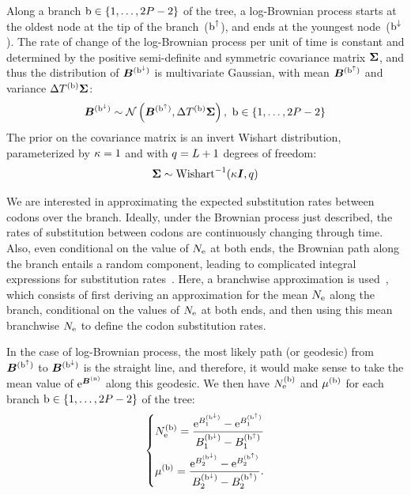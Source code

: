 \documentclass{MBE}
\begin{document}
	Along a branch $\text{b} \in \{1, \hdots, 2 P - 2\}$ of the tree, a log-Brownian process starts at the oldest node at the tip of the branch~($\text{b}^{\uparrow}$), and ends at the youngest node~($\text{b}^{\downarrow}$).
	The rate of change of the log-Brownian process per unit of time is constant and determined by the positive semi-definite and symmetric covariance matrix $\bm{\Sigma}$, and thus the distribution of $\bm{B}^{(\text{b}^{\downarrow})}$ is multivariate Gaussian, with mean $\bm{B}^{(\text{b}^{\uparrow})}$ and variance $\Delta T^{(\text{b})} \bm{\Sigma}$:
	\begin{equation}
		\label{eq:DistribBrownian}
		\Brownian^{(\nodeDown)} \sim \mathcal{N}\left(\Brownian^{(\nodeUp)}, \branchtime\branchexp \CovarianceMatrix \right),\ \Setbranch
	\end{equation}
	The {prior} on the covariance matrix is an invert Wishart distribution, parameterized by $\kappa=1$ and with $q=L + 1$ degrees of freedom:
	\begin{equation}
		\label{eq:Distribcovariance}
		\CovarianceMatrix \sim \text{Wishart}^{-1} (\covariancekappa \Identitymatrix, \covariancedf)
	\end{equation}

	We are interested in approximating the expected substitution rates between codons over the branch.
	Ideally, under the Brownian process just described, the rates of substitution between codons are continuously changing through time.
	Also, even conditional on the value of $N_{\text{e}}$ at both ends, the Brownian path along the branch entails a random component, leading to complicated integral expressions for substitution rates~\citep{Horvilleur2014}.
	Here, a branchwise approximation is used~\citep{Lartillot2011}, which consists of first deriving an approximation for the mean $N_{\text{e}}$ along the branch, conditional on the values of $N_{\text{e}}$ at both ends, and then using this mean branchwise $N_{\text{e}}$ to define the codon substitution rates.

	In the case of log-Brownian process, the most likely path (or geodesic) from $\bm{B}^{(\text{b}^{\uparrow})}$ to $\bm{B}^{(\text{b}^{\downarrow})}$ is the straight line, and therefore, it would make sense to take the mean value of $\text{e}^{\bm{B}^{(\text{n})}}$ along this geodesic.
	We then have $N_{\text{e}}^{(\text{b})}$ and $\mu^{(\text{b})}$ for each branch $\text{b} \in \{1, \hdots, 2 P - 2\}$ of the tree:
	\begin{equation}
		\label{eq:branchNemu}
		\begin{dcases}
			\Ne\branchexp = \dfrac{\e^{\brownian_{1}^{(\nodeDown)}} - \e^{\brownian_{1}^{(\nodeUp)}}}{\brownian_{1}^{(\nodeDown)} - \brownian_{1}^{(\nodeUp)}} \\
			\mu\branchexp = \dfrac{\e^{\brownian_{2}^{(\nodeDown)}} - \e^{\brownian_{2}^{(\nodeUp)}}}{\brownian_{2}^{(\nodeDown)} - \brownian_{2}^{(\nodeUp)}}.
		\end{dcases}
	\end{equation}
	
\end{document}
